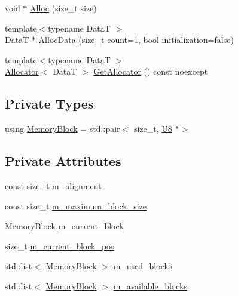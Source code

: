 \begin{DoxyCompactItemize}
\item 
void $\ast$ \mbox{\hyperlink{classmage_1_1_memory_arena_a2e63b11c535dbfefd69d071466be9ce1}{Alloc}} (size\+\_\+t size)
\item 
{\footnotesize template$<$typename DataT $>$ }\\DataT $\ast$ \mbox{\hyperlink{classmage_1_1_memory_arena_a1e83a02b5f5a74ad29d7a2c7f1f539d0}{Alloc\+Data}} (size\+\_\+t count=1, bool initialization=false)
\item 
{\footnotesize template$<$typename DataT $>$ }\\\mbox{\hyperlink{classmage_1_1_memory_arena_1_1_allocator}{Allocator}}$<$ DataT $>$ \mbox{\hyperlink{classmage_1_1_memory_arena_a722a884e077c903a586a6cb08ce98b24}{Get\+Allocator}} () const noexcept
\end{DoxyCompactItemize}
\subsection*{Private Types}
\begin{DoxyCompactItemize}
\item 
using \mbox{\hyperlink{classmage_1_1_memory_arena_a133e9d40bd216e3f1d98c6a2b36cf373}{Memory\+Block}} = std\+::pair$<$ size\+\_\+t, \mbox{\hyperlink{namespacemage_afc638980bc6154f15af5e2d93a0e0ea9}{U8}} $\ast$$>$
\end{DoxyCompactItemize}
\subsection*{Private Attributes}
\begin{DoxyCompactItemize}
\item 
const size\+\_\+t \mbox{\hyperlink{classmage_1_1_memory_arena_a424c3ff6f1d96545dd08f94c1c79c963}{m\+\_\+alignment}}
\item 
const size\+\_\+t \mbox{\hyperlink{classmage_1_1_memory_arena_aeef4c56cf50fd3cbbba2879fcd028b86}{m\+\_\+maximum\+\_\+block\+\_\+size}}
\item 
\mbox{\hyperlink{classmage_1_1_memory_arena_a133e9d40bd216e3f1d98c6a2b36cf373}{Memory\+Block}} \mbox{\hyperlink{classmage_1_1_memory_arena_a2680b25146c174ac7fd639f1bd0acc7c}{m\+\_\+current\+\_\+block}}
\item 
size\+\_\+t \mbox{\hyperlink{classmage_1_1_memory_arena_a880d07eb372ce1c8b907947fcbdfc59c}{m\+\_\+current\+\_\+block\+\_\+pos}}
\item 
std\+::list$<$ \mbox{\hyperlink{classmage_1_1_memory_arena_a133e9d40bd216e3f1d98c6a2b36cf373}{Memory\+Block}} $>$ \mbox{\hyperlink{classmage_1_1_memory_arena_a49a6d7fb9396f57210897abfb4e30903}{m\+\_\+used\+\_\+blocks}}
\item 
std\+::list$<$ \mbox{\hyperlink{classmage_1_1_memory_arena_a133e9d40bd216e3f1d98c6a2b36cf373}{Memory\+Block}} $>$ \mbox{\hyperlink{classmage_1_1_memory_arena_a02f251a5aafa61d239b4daed3458a654}{m\+\_\+available\+\_\+blocks}}
\end{DoxyCompactItemize}


